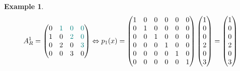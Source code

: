 \documentclass[11pt,a4paper,openright,oneside]{book}
\numberwithin{equation}{section}
\newtheorem{example0}[defn0]{Example}
\newenvironment{example}{ \begin{example0}\rm}{\end{example0}}
\begin{document}
{\begin{example}
$$A^1_R = \begin{pmatrix}
    0 & {\color{teal} 1} & {\color{teal} 0} & {\color{teal} 0} \\
    1 & 0 & {\color{teal}2} & {\color{teal} 0} \\
0 & 2 & 0 & {\color{teal}3} \\
        0 & 0 & 3 & 0 \\
    \end{pmatrix} \Leftrightarrow p_1(x) = \begin{pmatrix}
        1 & 0 & 0 & 0 & 0 & 0 \\
        0 & 1 & 0 & 0 & 0 & 0 \\
        0 & 0 & 1 & 0 & 0 & 0 \\
        0 & 0 & 0 & 1 & 0 & 0 \\
        0 & 0 & 0 & 0 & 1 & 0 \\
        0 & 0 & 0 & 0 & 0 & 1 \\
        \end{pmatrix} \begin{pmatrix}
        1 \\ 0 \\ 0 \\ 2 \\ 0 \\ 3
        \end{pmatrix} = \begin{pmatrix}
        1 \\ 0 \\ 0 \\ 2 \\ 0 \\ 3
    \end{pmatrix}$$


\end{example}}
\end{document}
